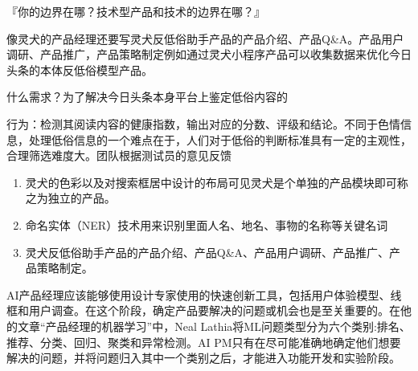 \documentclass[letterpaper,10pt,english]{sphinxmanual}
\begin{document}
『你的边界在哪？技术型产品和技术的边界在哪？』

像灵犬的产品经理还要写灵犬反低俗助手产品的产品介绍、产品Q\&A。产品用户调研、产品推广，产品策略制定例如通过灵犬小程序产品可以收集数据来优化今日头条的本体反低俗模型产品。

什么需求？为了解决今日头条本身平台上鉴定低俗内容的

行为：检测其阅读内容的健康指数，输出对应的分数、评级和结论。不同于色情信息，处理低俗信息的一个难点在于，人们对于低俗的判断标准具有一定的主观性，合理筛选难度大。团队根据测试员的意见反馈
\begin{enumerate}
%
\item {} 
灵犬的色彩以及对搜索框居中设计的布局可见灵犬是个单独的产品模块即可称之为独立的产品。

\item {} 
命名实体（NER）技术用来识别里面人名、地名、事物的名称等关键名词

\item {} 
灵犬反低俗助手产品的产品介绍、产品Q\&A、产品用户调研、产品推广、产品策略制定。

\end{enumerate}

AI产品经理应该能够使用设计专家使用的快速创新工具，包括用户体验模型、线框和用户调查。在这个阶段，确定产品要解决的问题或机会也是至关重要的。在他的文章“产品经理的机器学习”中，Neal
Lathia将ML问题类型分为六个类别:排名、推荐、分类、回归、聚类和异常检测。AI
PM只有在尽可能准确地确定他们想要解决的问题，并将问题归入其中一个类别之后，才能进入功能开发和实验阶段。%
\begin{footnote}[287]\sphinxAtStartFootnote
{}
%
\end{footnote}
\end{document}
